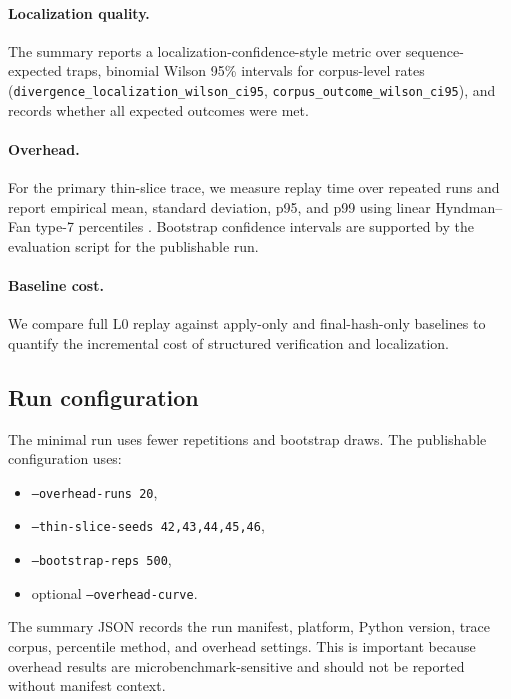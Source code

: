 \documentclass[11pt]{article}
\newcommand{\tool}[1]{\texttt{#1}}
\newcommand{\field}[1]{\texttt{#1}}
\newcommand{\Lzero}{\ensuremath{\mathrm{L0}}}
\begin{document}
\paragraph{Localization quality.}
The summary reports a localization-confidence-style metric over sequence-expected traps, binomial Wilson 95\% intervals for corpus-level rates (\field{divergence\_localization\_wilson\_ci95}, \field{corpus\_outcome\_wilson\_ci95}), and records whether all expected outcomes were met.

\paragraph{Overhead.}
For the primary thin-slice trace, we measure replay time over repeated runs and report empirical mean, standard deviation, p95, and p99 using linear Hyndman--Fan type-7 percentiles \cite{hyndman1996quantiles}. Bootstrap confidence intervals are supported by the evaluation script for the publishable run.

\paragraph{Baseline cost.}
We compare full \Lzero{} replay against apply-only and final-hash-only baselines to quantify the incremental cost of structured verification and localization.

\subsection{Run configuration}

The minimal run uses fewer repetitions and bootstrap draws. The publishable configuration uses:
\begin{itemize}[leftmargin=1.5em]
    \item \tool{--overhead-runs 20},
    \item \tool{--thin-slice-seeds 42,43,44,45,46},
    \item \tool{--bootstrap-reps 500},
    \item optional \tool{--overhead-curve}.
\end{itemize}

The summary JSON records the run manifest, platform, Python version, trace corpus, percentile method, and overhead settings. This is important because overhead results are microbenchmark-sensitive and should not be reported without manifest context.
\end{document}
